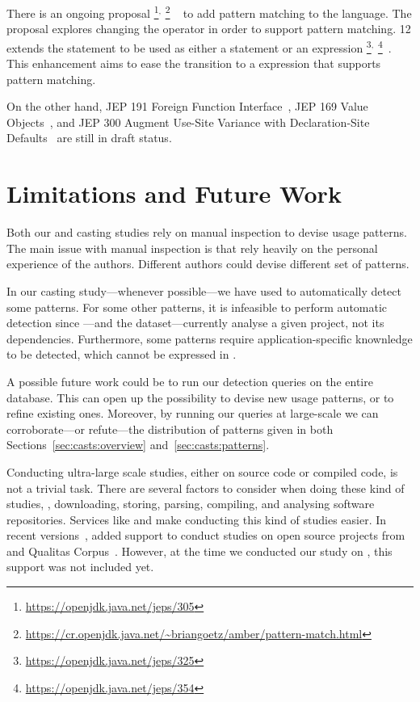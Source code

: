 There is an ongoing proposal%
\footnote{\url{https://openjdk.java.net/jeps/305}}$^{,}$%
\footnote{\url{https://cr.openjdk.java.net/~briangoetz/amber/pattern-match.html}}%
~\citep{jep305} to add pattern matching to the \java{} language.
The proposal explores changing the  operator in order to support pattern matching.
\java{} 12 extends the  statement to be used as either a statement or an expression%
\footnote{\url{https://openjdk.java.net/jeps/325}}$^{,}$%
\footnote{\url{https://openjdk.java.net/jeps/354}}~\citep{jep325,jep354}.
This enhancement aims to ease the transition to a  expression that supports pattern matching.

On the other hand,
JEP 191 Foreign Function Interface~\citep{jep191},
JEP 169 Value Objects~\citep{jep169}, and
JEP 300 Augment Use-Site Variance with Declaration-Site Defaults~\citep{jep300}
are still in draft status.

\section{Limitations and Future Work}

Both our \unsafe{} and casting studies rely on manual inspection to devise usage patterns.
The main issue with manual inspection is that rely heavily on the personal experience of the authors.
Different authors could devise different set of patterns.

In our casting study---whenever possible---we have used \ql{} to automatically detect some patterns.
For some other patterns, it is infeasible to perform automatic detection since \ql{}---and the \lgtm{} dataset---currently analyse a given project,
not its dependencies.
Furthermore, some patterns require application-specific knownledge to be detected,
which cannot be expressed in \ql{}.

A possible future work could be to run our detection queries on the entire \lgtm{} database.
This can open up the possibility to devise new usage patterns,
or to refine existing ones.
Moreover,
by running our queries at large-scale we can corroborate---or refute---the distribution of patterns given in both Sections~\ref{sec:casts:overview} and~\ref{sec:casts:patterns}.

Conducting ultra-large scale studies, either on source code or compiled code, is not a trivial task.
There are several factors to consider when doing these kind of studies,
\eg{}, downloading, storing, parsing, compiling,
and analysing software repositories.
Services like \boa{} and \lgtm{} make conducting this kind of studies easier.
In recent versions~\citep{boa-github},
\boa{} added support to conduct studies on open source projects from \github{} and Qualitas Corpus~\citep{temperoQualitasCorpusCurated2010}.
However, at the time we conducted our study on \unsafe{},
this support was not included yet.

